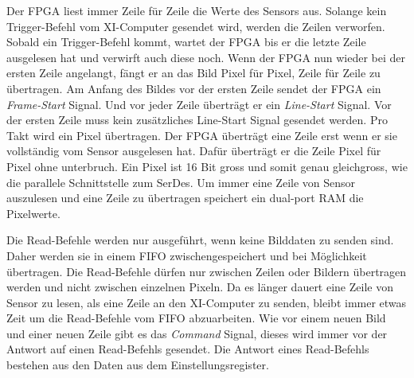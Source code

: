\documentclass{article}
\begin{document}
Der FPGA liest immer Zeile für Zeile die Werte des Sensors aus. Solange kein Trigger-Befehl vom XI-Computer gesendet wird, werden die Zeilen verworfen. Sobald ein Trigger-Befehl kommt, wartet der FPGA bis er die letzte Zeile ausgelesen hat und verwirft auch diese noch. Wenn der FPGA nun wieder bei der ersten Zeile angelangt, fängt er an das Bild Pixel für Pixel, Zeile für Zeile zu übertragen. Am Anfang des Bildes vor der ersten Zeile sendet der FPGA ein \textit{Frame-Start} Signal. Und vor jeder Zeile überträgt er ein \textit{Line-Start} Signal. Vor der ersten Zeile muss kein zusätzliches Line-Start Signal gesendet werden. Pro Takt wird ein Pixel übertragen. Der FPGA überträgt eine Zeile erst wenn er sie vollständig vom Sensor ausgelesen hat. Dafür überträgt er die Zeile Pixel für Pixel ohne unterbruch. Ein Pixel ist 16 Bit gross und somit genau gleichgross, wie die parallele Schnittstelle zum SerDes. Um immer eine Zeile von Sensor auszulesen und eine Zeile zu übertragen speichert ein dual-port RAM die Pixelwerte.

Die Read-Befehle werden nur ausgeführt, wenn keine Bilddaten zu senden sind. Daher werden sie in einem FIFO zwischengespeichert und bei Möglichkeit übertragen. Die Read-Befehle dürfen nur zwischen Zeilen oder Bildern übertragen werden und nicht zwischen einzelnen Pixeln. Da es länger dauert eine Zeile von Sensor zu lesen, als eine Zeile an den XI-Computer zu senden, bleibt immer etwas Zeit um die Read-Befehle vom FIFO abzuarbeiten. Wie vor einem neuen Bild und einer neuen Zeile gibt es das \textit{Command} Signal, dieses wird immer vor der Antwort auf einen Read-Befehls gesendet. Die Antwort eines Read-Befehls bestehen aus den Daten aus dem Einstellungsregister.
\end{document}
